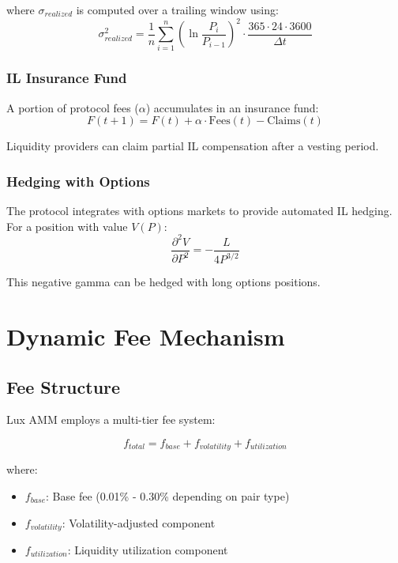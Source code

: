 \documentclass[11pt,a4paper]{article}
\begin{document}
where $\sigma_{realized}$ is computed over a trailing window using:
\begin{equation}
    \sigma_{realized}^2 = \frac{1}{n}\sum_{i=1}^{n}\left(\ln\frac{P_i}{P_{i-1}}\right)^2 \cdot \frac{365 \cdot 24 \cdot 3600}{\Delta t}
\end{equation}

\subsubsection{IL Insurance Fund}

A portion of protocol fees ($\alpha$) accumulates in an insurance fund:
\begin{equation}
    F(t+1) = F(t) + \alpha \cdot \text{Fees}(t) - \text{Claims}(t)
\end{equation}

Liquidity providers can claim partial IL compensation after a vesting period.

\subsubsection{Hedging with Options}

The protocol integrates with options markets to provide automated IL hedging. For a position with value $V(P)$:
\begin{equation}
    \frac{\partial^2 V}{\partial P^2} = -\frac{L}{4P^{3/2}}
\end{equation}

This negative gamma can be hedged with long options positions.

\section{Dynamic Fee Mechanism}

\subsection{Fee Structure}

Lux AMM employs a multi-tier fee system:

\begin{equation}
    f_{total} = f_{base} + f_{volatility} + f_{utilization}
\end{equation}

where:
\begin{itemize}
    \item $f_{base}$: Base fee (0.01\% - 0.30\% depending on pair type)
    \item $f_{volatility}$: Volatility-adjusted component
    \item $f_{utilization}$: Liquidity utilization component
\end{itemize}
\end{document}
